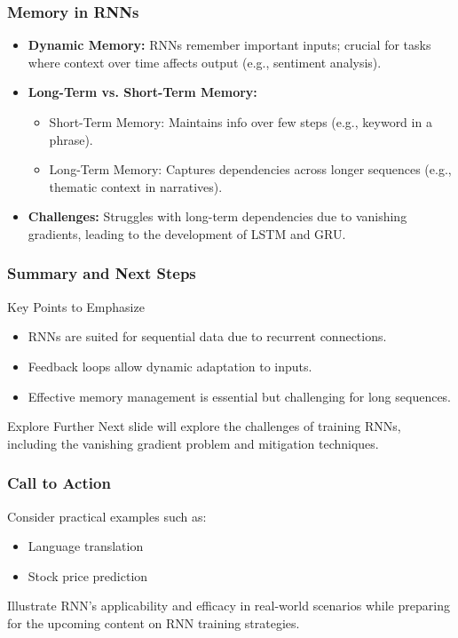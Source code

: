 \documentclass[aspectratio=169]{beamer}
\begin{document}
\begin{frame}[fragile]
    \frametitle{Memory in RNNs}
    \begin{itemize}
        \item \textbf{Dynamic Memory:} RNNs remember important inputs; crucial for tasks where context over time affects output (e.g., sentiment analysis).
        \item \textbf{Long-Term vs. Short-Term Memory:}
            \begin{itemize}
                \item Short-Term Memory: Maintains info over few steps (e.g., keyword in a phrase).
                \item Long-Term Memory: Captures dependencies across longer sequences (e.g., thematic context in narratives).
            \end{itemize}
        \item \textbf{Challenges:} Struggles with long-term dependencies due to vanishing gradients, leading to the development of LSTM and GRU.
    \end{itemize}
\end{frame}

\begin{frame}[fragile]
    \frametitle{Summary and Next Steps}
    \begin{block}{Key Points to Emphasize}
        \begin{itemize}
            \item RNNs are suited for sequential data due to recurrent connections.
            \item Feedback loops allow dynamic adaptation to inputs.
            \item Effective memory management is essential but challenging for long sequences.
        \end{itemize}
    \end{block}
    \begin{block}{Explore Further}
        Next slide will explore the challenges of training RNNs, including the vanishing gradient problem and mitigation techniques.
    \end{block}
\end{frame}

\begin{frame}[fragile]
    \frametitle{Call to Action}
    Consider practical examples such as:
    \begin{itemize}
        \item Language translation
        \item Stock price prediction
    \end{itemize}
    Illustrate RNN's applicability and efficacy in real-world scenarios while preparing for the upcoming content on RNN training strategies.
\end{frame}
\end{document}
